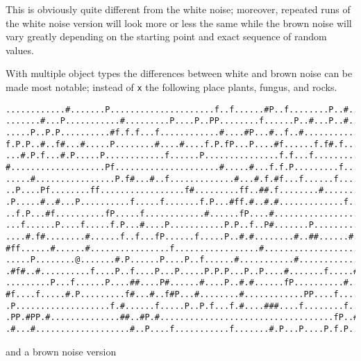 \documentclass[12pt,a4paper]{article}
\begin{document}
This is obviously quite different from the white noise; moreover,
repeated runs of the white noise version will look more or less the same
while the brown noise will vary greatly depending on the starting point
and exact sequence of random values.

With multiple object types the differences between white and brown noise
can be made most notable; instead of \texttt{x} the following place
plants, fungus, and rocks.

\begin{verbatim}
............#.......P.....................f..f......#P..f........P..#..P
.......#...P...........#.........P....P..PP........f......P..#...P..#..f
.....P..P.P..........#f.f.f...f............#....#P...#..f..#............
f.P.P..#..f#...#.....P........#....#....f.P.fP...P....#f......f.f#.f....
...#.P.f...#.P.....P............f......P...............f.f...f..........
#...................Pf.....................#.....#...f.f.P.........f...P
.....#................P.f#...#..f.............#...#.f.#f...f......f....P
..P....Pf........ff.................f#.........ff..##.f........#........
.P.....#..#...P..........f.....f.......f.P...#ff.#..#.#.............f...
..f.P...#f..........fP.....f............#......fP....#..................
...f......P....f.....f.P...#....P...........P.P..f..P#.......P..........
....#.f#........#......f..f...fP......f.....P..#.#........#..##......#.P
#ff......#......#................f.................#....................
.....P........@.......#.P......P....P..f......#...........#.............
.#f#..#..........f....P..f....P...P.....P.P.P...P..P....#.......f.....#.
.........P...f......P....##....P#......#....P..#.#......fP..........#...
#f....f.....#.P.........f#...#..f#P...#........#............PP....f....#
.P...................f.#......f.....P..P.f...f.#....###....f........f..f
.PP.#PP.#..............##..#P.#...................................fP..#.
.#...#...................#..P....f...........f.......#.P...P....P.f.P..f
\end{verbatim}

and a brown noise version
\end{document}
